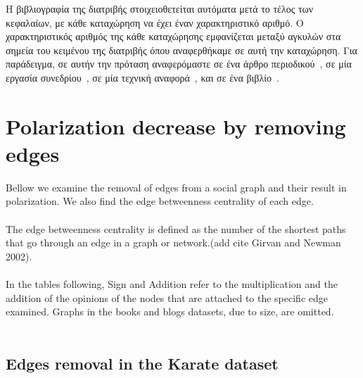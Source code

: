 Η βιβλιογραφία της διατριβής στοιχειοθετείται αυτόματα μετά το τέλος των κεφαλαίων, με κάθε καταχώρηση να έχει έναν χαρακτηριστικό αριθμό.
Ο χαρακτηριστικός αριθμός της κάθε καταχώρησης εμφανίζεται μεταξύ αγκυλών στα σημεία του κειμένου της διατριβής όπου αναφερθήκαμε σε αυτή την καταχώρηση.
Για παράδειγμα, σε αυτήν την πρόταση αναφερόμαστε σε ένα άρθρο περιοδικού~\cite{Newman2003a}, σε μία εργασία συνεδρίου~\cite{DeCandia2007a}, σε μία τεχνική αναφορά~\cite{Jain1984a}, και σε ένα βιβλίο~\cite{Golumbic2004a}.










\section{Polarization decrease by removing edges}
\label{sec:polremovingdecrease}
Bellow we examine the removal of edges from a social graph and their result in polarization. We also find the edge betweenness centrality of each edge. 
\\
\\
The edge betweenness centrality is defined as the number of the shortest paths that go through an edge in a graph or network.(add cite Girvan and Newman 2002). 
\\
\\
In the tables following, Sign and Addition refer to the multiplication and the addition of the opinions of the nodes that are attached to the specific edge examined. Graphs in the books and blogs datasets, due to size, are omitted.
\\
\\

\subsection{Edges removal in the Karate dataset}

